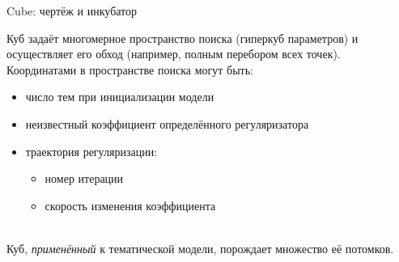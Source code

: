 \begin{frame}[t]{Cube: чертёж и инкубатор}

Куб задаёт многомерное пространство поиска (гиперкуб параметров) и осуществляет его обход (например, полным перебором всех точек). \\
\medskip
Координатами в пространстве поиска могут быть:

\begin{minipage}{0.5\textwidth}
{\small
    \begin{itemize}
        \setlength\itemsep{0em}
        \item число тем при инициализации модели
        \item неизвестный коэффициент определённого регуляризатора
        \item траектория регуляризации: \begin{itemize}
            \item номер итерации %
            \item скорость изменения коэффициента %
        \end{itemize}
    \end{itemize}
}
\end{minipage}
\begin{minipage}{0.4\textwidth}
\end{minipage}\\
\medskip
Куб, \textit{применённый} к тематической модели, порождает множество её потомков.


\end{frame}

